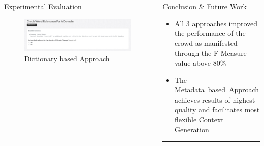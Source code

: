 \documentclass[final,hyperref={pdfpagelabels=true}]{beamer}
\newenvironment{myhline}
 {\par\setlength{\topskip}{0em}%
  \begin{list}{}{%
    \setlength{\leftmargin}{0em}%
    \setlength{\rightmargin}{3em}%
  }\item\relax}
 {\par\nopagebreak\rule{\linewidth}{0.4pt}\end{list}}
\begin{document}
\begin{frame}
\begin{columns}[t, onlytextwidth]
\begin{column}{\textwidth}
\begin{columns}[t, onlytextwidth]
\begin{column}{.49\textwidth}
\begin{block}{Experimental Evaluation}
\begin{minipage}[t][.25\textheight][c]{\textwidth}
\begin{minipage}[t]{\textwidth}
\begin{minipage}[t]{.49\textwidth}
\begin{minipage}[t]{\textwidth}
									\begin{figure}[H]
									 \centering
									 \includegraphics[width=\textwidth]{figures/questionaire_wordnik_example}
									 \caption{Dictionary based Approach}
									\end{figure}
								\end{minipage}
							\end{minipage}
						\end{minipage}
					\end{minipage}
				\end{block}
			\end{column}
			\begin{column}{.49\textwidth}
				\begin{block}{Conclusion \& Future Work}
					\begin{minipage}[t][.25\textheight][c]{\textwidth}
						\small
						{}
						
						\begin{itemize}
							\small
							\justifying
							\setlength\itemsep{1cm}
							\item All 3 approaches improved the performance of the crowd as manifested through the F-Measure value above 80\%
							\item The Metadata~based~Approach achieves results of highest quality and facilitates most flexible Context Generation
						\end{itemize}
						\begin{myhline}
							\hfill
						\end{myhline}
						\small
						{}
						

\end{minipage}
\end{block}
\end{column}
\end{columns}
\end{column}
\end{columns}
\end{frame}
\end{document}
